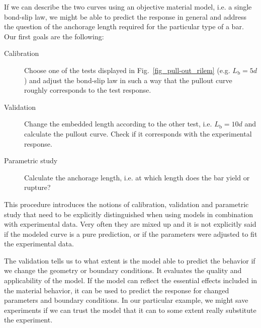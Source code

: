 \documentclass[main.tex]{subfiles}
\begin{document}
If we can describe the two curves using an objective material model, i.e. a single bond-slip law, we might be able to predict the response in general and address the question of the anchorage length required for the particular type of a bar. Our first goals are the following:
\begin{description}
\item[Calibration] Choose one of the tests displayed in Fig.~\ref{fig_pull-out_rilem} (e.g. $L_\mathrm{b} = 5d$) and adjust the bond-slip law in such a way that the pullout curve roughly corresponds to the test response.
\item[Validation] Change the embedded length according to the other test, i.e. $L_\mathrm{b} = 10d$ and calculate 
the pullout curve. Check if it corresponds with the experimental response.
\item[Parametric study] Calculate the anchorage length, i.e. at which length does the bar yield or rupture?
\end{description}
This procedure introduces the notions of calibration, validation and parametric study that need to be explicitly distinguished when using models in combination with experimental data. Very often they are mixed up and it is not explicitly said if the modeled curve is a pure prediction, or if the parameters were adjusted to fit the experimental data.

The validation tells us to what extent is the model able to predict the behavior if we change the geometry or boundary conditions. It evaluates the quality and applicability of the model. 
If the model can reflect the essential effects included in the material behavior, it can be used to predict the response for changed parameters and boundary conditions. In our particular example, we might save experiments if we can trust the model that it can to some extent really substitute the experiment.
\end{document}
